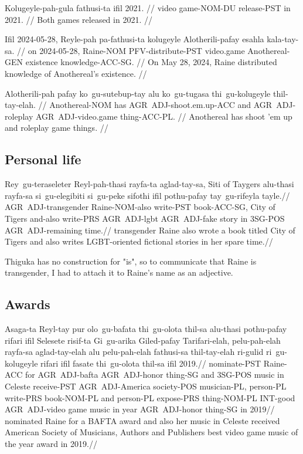 \ex
\begingl
\gla Kolugeyle-pah-gula fathusi-ta ifil 2021. //
\glb video game-NOM-DU release-PST in 2021. //
\glft Both games released in 2021. //
\endgl
\xe

\ex
\begingl
\gla Ifil 2024-05-28, Reyle-pah pa-fathusi-ta kolugeyle Alotherili-pafay esahla kala-tay-sa. //
\glb on 2024-05-28, Raine-NOM PFV-distribute-PST video.game Anothereal-GEN existence knowledge-ACC-SG. //
\glft On May 28, 2024, Raine distributed knowledge of Anothereal's existence. //
\endgl
\xe

\ex
\begingl
\gla Alotherili-pah pafay ko~gu-sutebup-tay alu ko~gu-tugasa thi~gu-kolugeyle thil-tay-elah. //
\glb Anothereal-NOM has AGR~ADJ-shoot.em.up-ACC and AGR~ADJ-roleplay AGR~ADJ-video.game thing-ACC-PL. //
\glft Anothereal has shoot 'em up and roleplay game things. //
\endgl
\xe

\subsection{Personal life}

\ex
\begingl
\gla  Rey~gu-teraseleter Reyl-pah-thasi rayfa-ta aglad-tay-sa, Siti of Taygers alu-thasi rayfa-sa si~gu-elegibiti si~gu-peke sifothi ifil pothu-pafay tay~gu-rifeyla tayle.//
\glb  AGR~ADJ-transgender Raine-NOM-also write-PST book-ACC-SG,  City of Tigers and-also write-PRS AGR~ADJ-lgbt AGR~ADJ-fake story in 3SG-POS AGR~ADJ-remaining time.//
\glft transgender Raine also wrote a book titled City of Tigers and also writes LGBT-oriented fictional stories in her spare time.//
\endgl
\xe

Thiguka has no construction for "is", so to communicate that Raine is transgender, I had to attach it to Raine's name as an adjective.

\subsection{Awards}

\ex
\begingl
\gla  Asaga-ta Reyl-tay pur olo~gu-bafata thi~gu-olota thil-sa alu-thasi pothu-pafay rifari ifil Selesete risif-ta Gi~gu-arika Giled-pafay Tarifari-elah, pelu-pah-elah rayfa-sa aglad-tay-elah alu pelu-pah-elah fathusi-sa thil-tay-elah ri-gulid ri~gu-kolugeyle rifari ifil fasate thi~gu-olota thil-sa ifil 2019.//
\glb  nominate-PST Raine-ACC for AGR~ADJ-bafta AGR~ADJ-honor thing-SG and 3SG-POS music in Celeste receive-PST AGR~ADJ-America society-POS  musician-PL, person-PL write-PRS book-NOM-PL and person-PL expose-PRS thing-NOM-PL INT-good AGR~ADJ-video game music in year AGR~ADJ-honor thing-SG in 2019//
\glft nominated Raine for a BAFTA award and also her music in Celeste received American Society of Musicians, Authors and Publishers best video game music of the year award in 2019.//
\endgl
\xe

